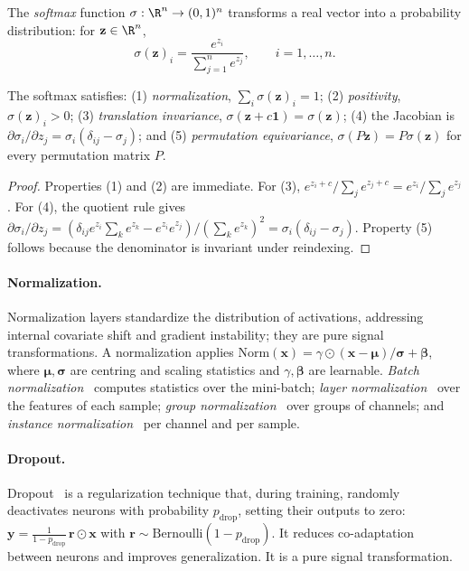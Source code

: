 \begin{definition}[Softmax]
\label{def:found:softmax}
The \emph{softmax} function $\sigma : \R^n \to (0,1)^n$ transforms a real vector
into a probability distribution: for $\mathbf{z} \in \R^n$,
\[
  \sigma(\mathbf{z})_i = \frac{e^{z_i}}{\sum_{j=1}^n e^{z_j}}, \qquad
  i = 1, \ldots, n.
\]
\end{definition}

\begin{proposition}
\label{prop:found:softmax}
The softmax satisfies: (1) \emph{normalization}, $\sum_i \sigma(\mathbf{z})_i =
1$; (2) \emph{positivity}, $\sigma(\mathbf{z})_i > 0$; (3) \emph{translation
invariance}, $\sigma(\mathbf{z} + c\mathbf{1}) = \sigma(\mathbf{z})$; (4) the
Jacobian is $\partial \sigma_i / \partial z_j = \sigma_i(\delta_{ij} -
\sigma_j)$; and (5) \emph{permutation equivariance}, $\sigma(P\mathbf{z}) =
P\sigma(\mathbf{z})$ for every permutation matrix $P$.
\end{proposition}

\begin{proof}
Properties (1) and (2) are immediate. For (3), $e^{z_i + c}/\sum_j e^{z_j + c} =
e^{z_i}/\sum_j e^{z_j}$. For (4), the quotient rule gives
$\partial \sigma_i/\partial z_j = (\delta_{ij}e^{z_i}\sum_k e^{z_k} -
e^{z_i}e^{z_j})/(\sum_k e^{z_k})^2 = \sigma_i(\delta_{ij} - \sigma_j)$.
Property (5) follows because the denominator is invariant under reindexing.
\end{proof}

\paragraph{Normalization.}
Normalization layers standardize the distribution of activations, addressing
internal covariate shift and gradient instability; they are pure signal
transformations. A normalization applies
$\mathrm{Norm}(\mathbf{x}) = \gamma \odot (\mathbf{x} - \boldsymbol{\mu})/
\boldsymbol{\sigma} + \boldsymbol{\beta}$, where $\boldsymbol{\mu},
\boldsymbol{\sigma}$ are centring and scaling statistics and $\gamma,
\boldsymbol{\beta}$ are learnable. \emph{Batch
normalization}~\citep{ioffe2015batch} computes statistics over the mini-batch;
\emph{layer normalization}~\citep{ba2016layer} over the features of each sample;
\emph{group normalization}~\citep{wu2018group} over groups of channels; and
\emph{instance normalization}~\citep{ulyanov2016instance} per channel and per
sample.

\paragraph{Dropout.}
Dropout~\citep{srivastava2014dropout} is a regularization technique that, during
training, randomly deactivates neurons with probability $p_{\mathrm{drop}}$,
setting their outputs to zero:
$\mathbf{y} = \frac{1}{1-p_{\mathrm{drop}}}\,\mathbf{r} \odot \mathbf{x}$ with
$\mathbf{r} \sim \mathrm{Bernoulli}(1-p_{\mathrm{drop}})$. It reduces
co-adaptation between neurons and improves generalization. It is a pure signal
transformation.

